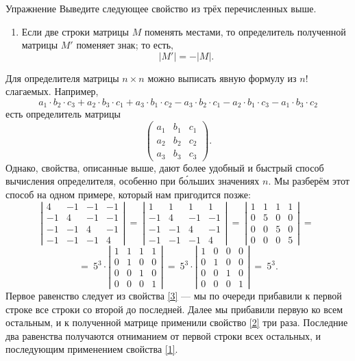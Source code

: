 \documentclass{article}
\begin{document}
\begin{thm}{Упражнение}
Выведите следующее свойство из трёх перечисленных выше.
\end{thm}

\begin{enumerate}[resume]
 \item 
Если две строки матрицы $M$ поменять местами, то определитель полученной матрицы $M'$ поменяет знак; то есть,
\[|M'|=-|M|.\]
\end{enumerate}


Для определителя матрицы $n\times n$ можно выписать явную формулу из $n!$ слагаемых. 
Например, 
\[
a_1{\cdot} b_2{\cdot} c_3+a_2{\cdot} b_3{\cdot} c_1+a_3{\cdot} b_1{\cdot} c_2-a_3{\cdot} b_2{\cdot} c_1-a_2{\cdot} b_1{\cdot} c_3-a_1{\cdot} b_3{\cdot} c_2\]
есть определитель матрицы
\[\left(
\begin{matrix}
a_1&b_1&c_1
\\
a_2&b_2&c_2
\\
a_3&b_3&c_3
\end{matrix}
\right).\]
Однако, свойства, описанные выше, дают более удобный и быстрый способ вычисления определителя, особенно при б\'{о}льших значениях $n$.
Мы разберём этот способ на одном примере, который нам пригодится позже:
\[\left|
\begin{matrix}
4&-1&-1&-1
\\
-1&4&-1&-1
\\
-1&-1&4&-1
\\
-1&-1&-1&4
\end{matrix}
\right|
\ 
=
\ 
\left|
\begin{matrix}
1&1&1&1
\\
-1&4&-1&-1
\\
-1&-1&4&-1
\\
-1&-1&-1&4
\end{matrix}
\right|
\ 
=
\ 
\left|
\begin{matrix}
1&1&1&1
\\
0&5&0&0
\\
0&0&5&0
\\
0&0&0&5
\end{matrix}
\right|
\ 
=
\ 
\]
\[
=\ 
5^3\cdot
\left|
\begin{matrix}
1&1&1&1
\\
0&1&0&0
\\
0&0&1&0
\\
0&0&0&1
\end{matrix}
\right|\ =\ 
5^3\cdot\left|
\begin{matrix}
1&0&0&0
\\
0&1&0&0
\\
0&0&1&0
\\
0&0&0&1
\end{matrix}
\right|
\ =\ 5^3.\]
Первое равенство следует из свойства \ref{3} --- мы по очереди прибавили к первой строке все строки со второй до последней. 
Далее мы прибавили первую ко всем остальным, и к полученной матрице применили свойство \ref{2} три раза.
Последние два равенства получаются отниманием от первой строки всех остальных, и последующим применением свойства \ref{1}.
\end{document}
